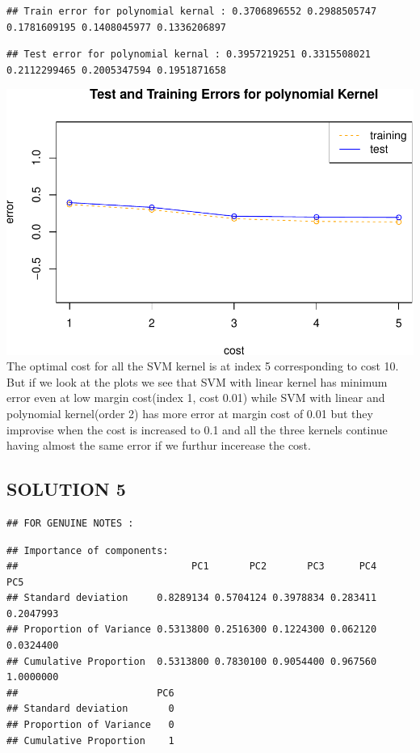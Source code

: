 \documentclass[]{article}
\begin{document}
\begin{verbatim}
## Train error for polynomial kernal : 0.3706896552 0.2988505747 0.1781609195 0.1408045977 0.1336206897
\end{verbatim}

\begin{verbatim}
## Test error for polynomial kernal : 0.3957219251 0.3315508021 0.2112299465 0.2005347594 0.1951871658
\end{verbatim}

\includegraphics{HW5_Solution_files/figure-latex/unnamed-chunk-4-3.pdf}
The optimal cost for all the SVM kernel is at index 5 corresponding to
cost 10. But if we look at the plots we see that SVM with linear kernel
has minimum error even at low margin cost(index 1, cost 0.01) while SVM
with linear and polynomial kernel(order 2) has more error at margin cost
of 0.01 but they improvise when the cost is increased to 0.1 and all the
three kernels continue having almost the same error if we furthur
incerease the cost.

\subsection{SOLUTION 5}\label{solution-5}

\begin{verbatim}
## FOR GENUINE NOTES :
\end{verbatim}

\begin{verbatim}
## Importance of components:
##                              PC1       PC2       PC3      PC4       PC5
## Standard deviation     0.8289134 0.5704124 0.3978834 0.283411 0.2047993
## Proportion of Variance 0.5313800 0.2516300 0.1224300 0.062120 0.0324400
## Cumulative Proportion  0.5313800 0.7830100 0.9054400 0.967560 1.0000000
##                        PC6
## Standard deviation       0
## Proportion of Variance   0
## Cumulative Proportion    1
\end{verbatim}
\end{document}
